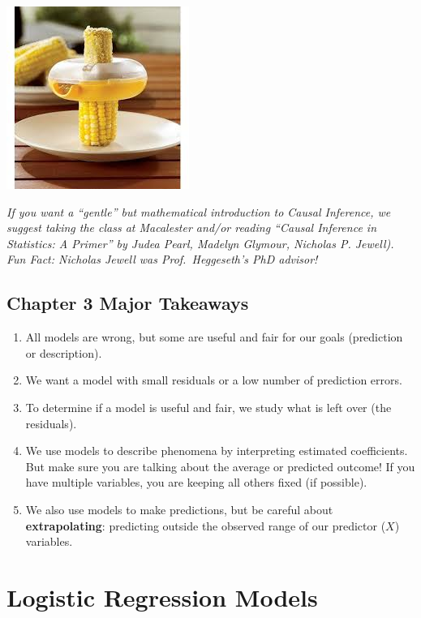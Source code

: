 \documentclass[
]{book}
\begin{document}
\includegraphics{Photos/corn.jpeg}

\emph{If you want a ``gentle'' but mathematical introduction to Causal Inference, we suggest taking the class at Macalester and/or reading ``Causal Inference in Statistics: A Primer'' by Judea Pearl, Madelyn Glymour, Nicholas P. Jewell). Fun Fact: Nicholas Jewell was Prof.~Heggeseth's PhD advisor!}

\hypertarget{chapter-3-major-takeaways}{%
\section{Chapter 3 Major Takeaways}\label{chapter-3-major-takeaways}}

\begin{enumerate}
\def\labelenumi{\arabic{enumi}.}
\item
  All models are wrong, but some are useful and fair for our goals (prediction or description).
\item
  We want a model with small residuals or a low number of prediction errors.
\item
  To determine if a model is useful and fair, we study what is left over (the residuals).
\item
  We use models to describe phenomena by interpreting estimated coefficients. But make sure you are talking about the average or predicted outcome! If you have multiple variables, you are keeping all others fixed (if possible).
\item
  We also use models to make predictions, but be careful about \textbf{extrapolating}: predicting outside the observed range of our predictor (\(X\)) variables.
\end{enumerate}

\hypertarget{logistic}{%
\chapter{Logistic Regression Models}\label{logistic}}
\end{document}
